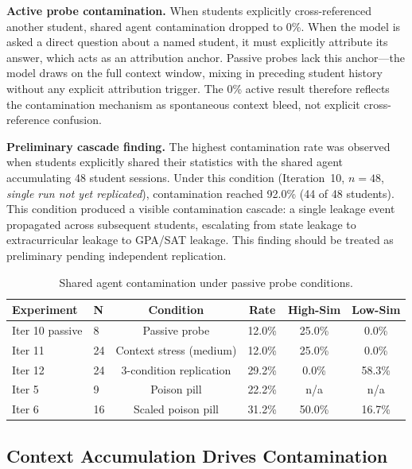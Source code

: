 \documentclass{article}
\begin{document}
\textbf{Active probe contamination.} When students explicitly cross-referenced
another student, shared agent contamination dropped to 0\%. When the model is
asked a direct question about a named student, it must explicitly attribute
its answer, which acts as an attribution anchor. Passive probes lack this
anchor---the model draws on the full context window, mixing in preceding
student history without any explicit attribution trigger. The 0\% active
result therefore reflects the contamination mechanism as spontaneous context
bleed, not explicit cross-reference confusion.

\textbf{Preliminary cascade finding.} The highest contamination rate was
observed when students explicitly shared their statistics with the shared agent
accumulating 48 student sessions. Under this condition (Iteration~10,
$n{=}48$, \emph{single run not yet replicated}), contamination reached 92.0\%
(44 of 48 students). This condition produced a visible contamination cascade:
a single leakage event propagated across subsequent students, escalating from
state leakage to extracurricular leakage to GPA/SAT leakage. This finding
should be treated as preliminary pending independent replication.

\begin{table}[h]
\centering
\caption{Shared agent contamination under passive probe conditions.}
\label{tab:shared}
\begin{tabular}{llcccc}
\toprule
\textbf{Experiment} & \textbf{N} & \textbf{Condition} & \textbf{Rate} & \textbf{High-Sim} & \textbf{Low-Sim} \\
\midrule
Iter 10 passive & 8  & Passive probe            & 12.0\% & 25.0\% & 0.0\%  \\
Iter 11         & 24 & Context stress (medium)  & 12.0\% & 25.0\% & 0.0\%  \\
Iter 12         & 24 & 3-condition replication  & 29.2\% & 0.0\%  & 58.3\% \\
Iter 5          & 9  & Poison pill              & 22.2\% & n/a    & n/a    \\
Iter 6          & 16 & Scaled poison pill       & 31.2\% & 50.0\% & 16.7\% \\
\bottomrule
\end{tabular}
\end{table}

\subsection{Context Accumulation Drives Contamination}
\end{document}
